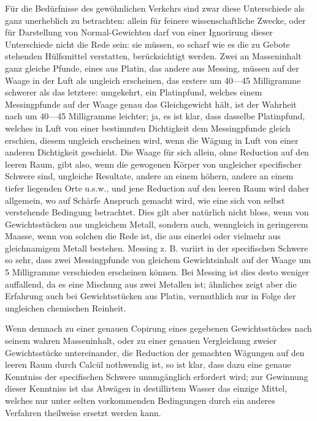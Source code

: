 Für die Bedürfnisse des gewöhnlichen Verkehrs sind zwar diese Unterschiede
\clearpage{}
\noindent als ganz unerheblich zu betrachten: allein für feinere wissenschaftliche
Zwecke, oder für Darstellung von Normal-Gewichten darf von einer Ignorirung
dieser Unterschiede nicht die Rede sein: sie müssen, so scharf wie es die zu
Gebote stehenden Hülfsmittel verstatten, berücksichtigt werden. Zwei an
Masseninhalt ganz gleiche Pfunde, eines aus Platin, das andere aus Messing,
müssen auf der Waage in der Luft als ungleich erscheinen, das erstere um
40—45 Milligramme schwerer als das letztere: umgekehrt, ein Platinpfund,
welches einem Messingpfunde auf der Waage genau das Gleichgewicht hält,
ist der Wahrheit nach um 40—45 Milligramme leichter; ja, es ist klar, dass
dasselbe Platinpfund, welches in Luft von einer bestimmten Dichtigkeit dem
Messingpfunde gleich erschien, diesem ungleich erscheinen wird, wenn die
Wägung in Luft von einer anderen Dichtigkeit geschieht. Die Waage für
sich allein, ohne Reduction auf den leeren Raum, gibt also, wenn die gewogenen
Körper von ungleicher specifischer Schwere sind, ungleiche Resultate,
andere an einem höhern, andere an einem tiefer liegenden Orte u.s.w., und
jene Reduction auf den leeren Raum wird daher allgemein, wo auf Schärfe
Anspruch gemacht wird, wie eine sich von selbst verstehende Bedingung betrachtet.
Dies gilt aber natürlich nicht bloss, wenn von Gewichtsstücken aus
ungleichem Metall, sondern auch, wenngleich in geringerem Maasse, wenn von
solchen die Rede ist, die aus einerlei oder vielmehr aus gleichnamigem Metall
bestehen. Messing z. B. variirt in der specifischen Schwere so sehr, dass zwei
Messingpfunde von gleichem Gewichtsinhalt auf der Waage um 5 Milligramme
verschieden erscheinen können. Bei Messing ist dies desto weniger auffallend,
da es eine Mischung aus zwei Metallen ist; ähnliches zeigt aber die Erfahrung
auch bei Gewichtsstücken aus Platin, vermuthlich nur in Folge der ungleichen
chemischen Reinheit.

Wenn demnach zu einer genauen Copirung eines gegebenen Gewichtsstückes
nach seinem wahren Masseninhalt, oder zu einer genauen Vergleichung
zweier Gewichtsstücke untereinander, die Reduction der gemachten Wägungen
auf den leeren Raum durch Calcül nothwendig ist, so ist klar, dass dazu
eine genaue Kenntniss der specifischen Schwere unumgänglich erfordert wird;
zur Gewinnung dieser Kenntniss ist das Abwägen in destillirtem Wasser das
einzige Mittel, welches nur unter selten vorkommenden Bedingungen durch
ein anderes Verfahren theilweise ersetzt werden kann.

